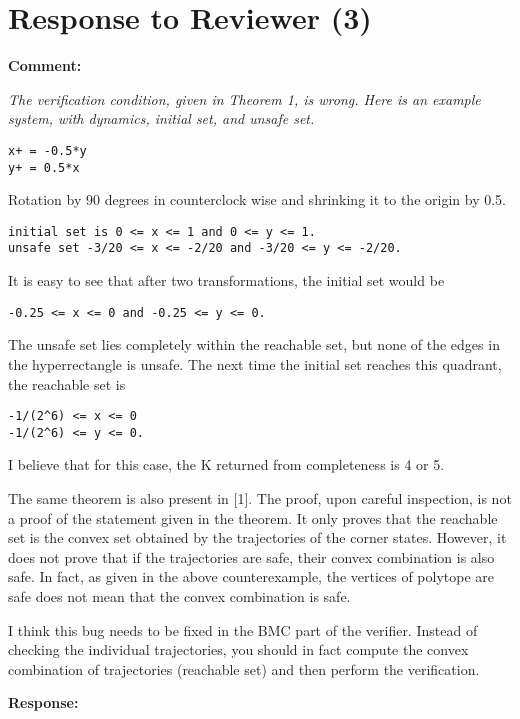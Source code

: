 \documentclass{article}
\begin{document}
\vspace{2em}

\section{Response to Reviewer (3)}

{\bf Comment: }{\itshape
The verification condition, given in Theorem 1, is wrong. Here is an example system, with dynamics, initial set, and unsafe set.

\begin{verbatim}
x+ = -0.5*y
y+ = 0.5*x
\end{verbatim}


Rotation by 90 degrees in counterclock wise and shrinking it to the origin by 0.5.
\begin{verbatim}
initial set is 0 <= x <= 1 and 0 <= y <= 1.
unsafe set -3/20 <= x <= -2/20 and -3/20 <= y <= -2/20.
\end{verbatim}

It is easy to see that after two transformations, the initial set would be
\begin{verbatim}
-0.25 <= x <= 0 and -0.25 <= y <= 0.
\end{verbatim}
The unsafe set lies completely within the reachable set, but none of the edges in the hyperrectangle is unsafe. The next time the initial set reaches
this quadrant, the reachable set is
\begin{verbatim}
-1/(2^6) <= x <= 0
-1/(2^6) <= y <= 0.
\end{verbatim}

I believe that for this case, the K returned from completeness is 4 or 5.

The same theorem is also present in [1]. The proof, upon careful inspection, is not a proof of the statement given in the theorem. It only proves
that the reachable set is the convex set obtained by the trajectories of the corner states. However, it does not prove that if the trajectories are
safe, their convex combination is also safe. In fact, as given in the above counterexample, the vertices of polytope are safe does not mean that the
convex combination is safe.

I think this bug needs to be fixed in the BMC part of the verifier. Instead of checking the individual trajectories, you should in fact compute the
convex combination of trajectories (reachable set) and then perform the verification.}

\vspace{1em}
{\bf Response: }
\vspace{2em}
\end{document}
